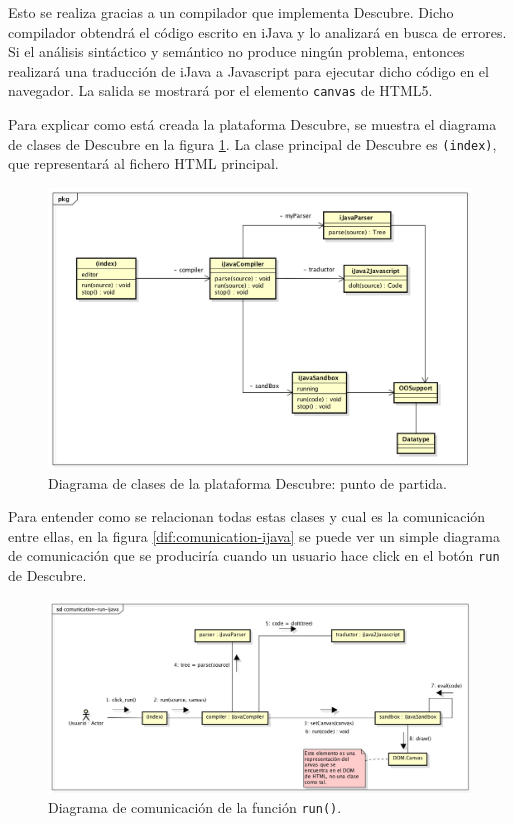 Esto se realiza gracias a un compilador que implementa Descubre. Dicho compilador obtendrá el código escrito en iJava y lo analizará en busca de errores. Si el análisis sintáctico y semántico no produce ningún problema, entonces realizará una traducción de iJava a Javascript para ejecutar dicho código en el navegador. La salida se mostrará por el elemento \texttt{canvas} de HTML5.

Para explicar como está creada la plataforma Descubre, se muestra el diagrama de clases de Descubre en la figura \ref{fig:diagram-ijava}. La clase principal de Descubre es \texttt{(index)}, que representará al fichero HTML principal.

\begin{figure}[!ht]
	\begin{centering}
		\includegraphics[width=1\textwidth]{images/diagram-ijava.png}
			\caption{Diagrama de clases de la plataforma Descubre: punto de partida.}
				\label{fig:diagram-ijava}
	\end{centering}
\end{figure}

Para entender como se relacionan todas estas clases y cual es la comunicación entre ellas, en la figura \ref{dif:comunication-ijava} se puede ver un simple diagrama de comunicación que se produciría cuando un usuario hace click en el botón \texttt{run} de Descubre.

\begin{figure}[!ht]
	\begin{centering}
		\includegraphics[width=1\textwidth]{images/comunication-run-ijava.png}
			\caption{Diagrama de comunicación de la función \texttt{run()}.}
				\label{fig:comunication-ijava}
	\end{centering}
\end{figure}

